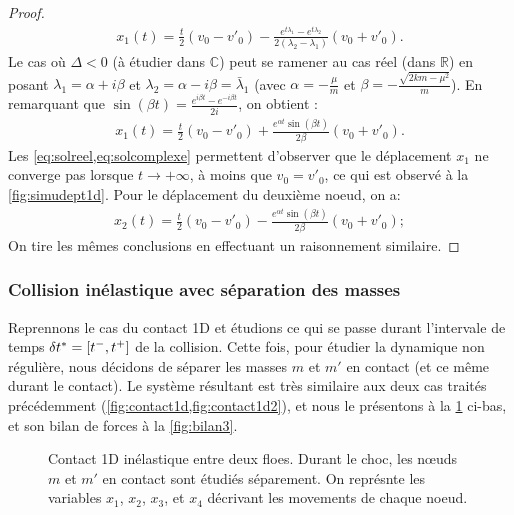 \begin{proof}
\begin{align} \label{eq:solreel}
    x_1(t) = \frac{t}{2}\left( v_0 - v'_0 \right) - \frac{e^{t\lambda_1} - e^{t\lambda_2}}{2(\lambda_2 - \lambda_1)}\left( v_0 + v'_0 \right).
\end{align}
Le cas où $\Delta < 0$ (à étudier dans $\mathbb{C}$) peut se ramener au cas réel (dans $\mathbb{R}$) en posant $\lambda_1 = \alpha + i \beta$ et $\lambda_2 = \alpha - i \beta = \bar{\lambda}_1$ (avec $\alpha = -\frac{\mu}{m}$ et $\beta = -\frac{\sqrt{2km - \mu^2}}{m}$). En remarquant que $\sin(\beta t) = \frac{e^{i\beta t} - e^{-i\beta t}}{2i}$, on obtient :
\begin{align} \label{eq:solcomplexe}
    x_1(t) = \frac{t}{2}\left( v_0 - v'_0 \right) + \frac{e^{\alpha t} \sin(\beta t)}{2\beta} \left( v_0 + v'_0 \right).
\end{align}
Les \cref{eq:solreel,eq:solcomplexe} permettent d'observer que le déplacement $x_1$ ne converge pas lorsque $t \rightarrow +\infty$, à moins que $v_0 = v'_0$, ce qui est observé à la \cref{fig:simudept1d}. Pour le déplacement du deuxième noeud, on a:
\begin{align} \label{eq:solcomplexe}
    x_2(t) = \frac{t}{2}\left( v_0 - v'_0 \right) - \frac{e^{\alpha t} \sin(\beta t)}{2\beta} \left( v_0 + v'_0 \right);
\end{align}
On tire les mêmes conclusions en effectuant un raisonnement similaire.

\end{proof}








\subsubsection{Collision inélastique avec séparation des masses}
\label{subsubsec:colinesepma}

Reprennons le cas du contact 1D et étudions ce qui se passe durant l'intervale de temps $\delta t^{*} = [t^{-}, t^{+}]$ de la collision. Cette fois, pour étudier la dynamique non régulière, nous décidons de séparer les masses $m$ et $m'$ en contact (et ce même durant le contact). Le système résultant est très similaire aux deux cas traités précédemment (\cref{fig:contact1d,fig:contact1d2}), et nous le présentons à la \cref{fig:contact1d3} ci-bas, et son bilan de forces à la \cref{fig:bilan3}.

\begin{figure}[!h]
    \centering
    \caption{Contact 1D inélastique entre deux floes. Durant le choc, les nœuds $m$ et $m'$ en contact sont étudiés séparement. On représnte les variables $x_1$, $x_2$, $x_3$, et $x_4$ décrivant les movements de chaque noeud.}
    \label{fig:contact1d3}
\end{figure}


